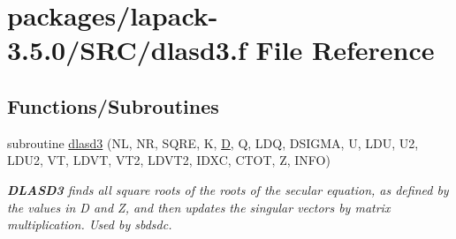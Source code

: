 \hypertarget{dlasd3_8f}{}\section{packages/lapack-\/3.5.0/\+S\+R\+C/dlasd3.f File Reference}
\label{dlasd3_8f}
\subsection*{Functions/\+Subroutines}
\begin{DoxyCompactItemize}
\item 
subroutine \hyperlink{group__auxOTHERauxiliary_ga791d0eee86fc85a3e132e613c55d1d56}{dlasd3} (N\+L, N\+R, S\+Q\+R\+E, K, \hyperlink{odrpack_8h_a7dae6ea403d00f3687f24a874e67d139}{D}, Q, L\+D\+Q, D\+S\+I\+G\+M\+A, U, L\+D\+U, U2, L\+D\+U2, V\+T, L\+D\+V\+T, V\+T2, L\+D\+V\+T2, I\+D\+X\+C, C\+T\+O\+T, Z, I\+N\+F\+O)
\begin{DoxyCompactList}\small\item\em {\bfseries D\+L\+A\+S\+D3} finds all square roots of the roots of the secular equation, as defined by the values in D and Z, and then updates the singular vectors by matrix multiplication. Used by sbdsdc. \end{DoxyCompactList}\end{DoxyCompactItemize}

